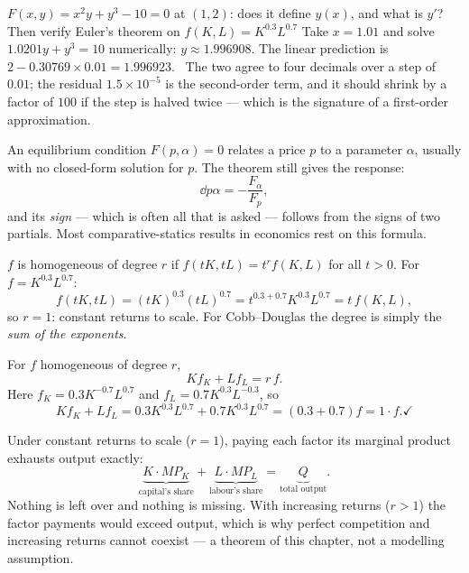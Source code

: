 \begin{worked}{$F(x,y)=x^{2}y+y^{3}-10=0$ at $(1,2)$: does it define $y(x)$, and what is $y'$? Then verify Euler's theorem on $f(K,L)=K^{0.3}L^{0.7}$}
Take $x=1.01$ and solve $1.0201y+y^{3}=10$ numerically: $y\approx1.996908$.
The linear prediction is $2-0.30769\times0.01=1.996923$. \checkmark\ The two
agree to four decimals over a step of $0.01$; the residual $1.5\times10^{-5}$
is the second-order term, and it should shrink by a factor of $100$ if the
step is halved twice --- which is the signature of a first-order
approximation.

An equilibrium condition $F(p,\alpha)=0$ relates a price $p$ to a parameter
$\alpha$, usually with no closed-form solution for $p$. The theorem still
gives the response:
\[
  \dd{p}{\alpha}=-\frac{F_{\alpha}}{F_{p}} ,
\]
and its \emph{sign} --- which is often all that is asked --- follows from
the signs of two partials. Most comparative-statics results in economics
rest on this formula.

$f$ is homogeneous of degree $r$ if $f(tK,tL)=t^{r}f(K,L)$ for all $t>0$.
For $f=K^{0.3}L^{0.7}$:
\[
  f(tK,tL)=(tK)^{0.3}(tL)^{0.7}=t^{0.3+0.7}K^{0.3}L^{0.7}=t\,f(K,L),
\]
so $r=1$: constant returns to scale. For Cobb--Douglas the degree is simply
the \emph{sum of the exponents}.

For $f$ homogeneous of degree $r$,
\[
  K f_{K}+L f_{L}=r\,f .
\]
Here $f_{K}=0.3K^{-0.7}L^{0.7}$ and $f_{L}=0.7K^{0.3}L^{-0.3}$, so
\[
  Kf_{K}+Lf_{L}=0.3K^{0.3}L^{0.7}+0.7K^{0.3}L^{0.7}
  =(0.3+0.7)f=1\cdot f . \checkmark
\]

Under constant returns to scale ($r=1$), paying each factor its marginal
product exhausts output exactly:
\[
  \underbrace{K\cdot MP_{K}}_{\text{capital's share}}
  +\underbrace{L\cdot MP_{L}}_{\text{labour's share}}
  =\underbrace{Q}_{\text{total output}} .
\]
Nothing is left over and nothing is missing. With increasing returns
($r>1$) the factor payments would exceed output, which is why perfect
competition and increasing returns cannot coexist --- a theorem of this
chapter, not a modelling assumption.
\end{worked}

